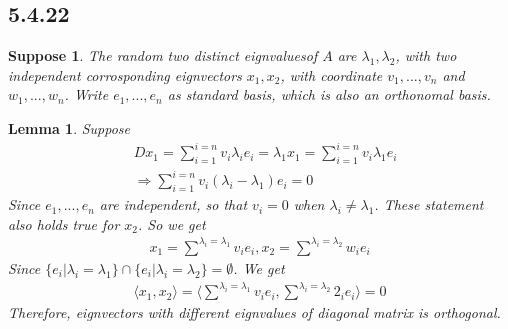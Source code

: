\documentclass{article}
\newtheorem*{suppose}{Suppose}
\newtheorem*{lemma}{Lemma}
\begin{document}
\subsection*{5.4.22}
\begin{suppose}
    The random two distinct eignvaluesof $A$ are $\lambda_1, \lambda_2$, with two independent corrosponding eignvectors $x_1, x_2$, with 
    coordinate $v_1, ..., v_n$ and $w_1, ..., w_n$. Write $e_1, ..., e_n$ as standard basis, which is also an orthonomal basis.
\end{suppose}
\begin{lemma}
    Suppose
    \begin{equation*}
        \begin{split}
            & Dx_1 = \sum_{i = 1}^{i = n} v_i \lambda_i e_i = \lambda_1x_1 = \sum_{i = 1}^{i = n} v_i \lambda_1 e_i \\
            & \Rightarrow \sum_{i = 1}^{i = n} v_i (\lambda_i - \lambda_1) e_i = 0
        \end{split}
    \end{equation*}
    Since $e_1, ..., e_n$ are independent, so that $v_i = 0$ when $\lambda_i \ne \lambda_1$. These statement also holds true for $x_2$. So we get 
    \begin{equation*}
        \begin{split}
            x_1 = \stackrel{\lambda_i = \lambda_1}{\sum} v_ie_i, x_2 =  \stackrel{\lambda_i = \lambda_2}{\sum} w_ie_i
        \end{split}
    \end{equation*}
    Since $\{e_i | \lambda_i = \lambda_1\} \cap \{e_i | \lambda_i = \lambda_2\} = \emptyset$.
    We get \begin{equation*}
        \begin{split}
            \langle x_1, x_2 \rangle = \langle \stackrel{\lambda_i = \lambda_1}{\sum} v_ie_i, \stackrel{\lambda_i = \lambda_2}{\sum} 2_ie_i\rangle = 0
        \end{split}
    \end{equation*}
    Therefore, eignvectors with different eignvalues of diagonal matrix is orthogonal.
\end{lemma}
\end{document}
